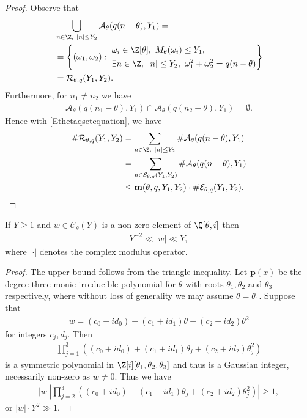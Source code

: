 \documentclass[12pt]{amsart}
\newcommand{\1}{\mathmybb{1}}
\begin{document}
\begin{proof}
Observe that
\begin{align*}
&\bigcup_{n\in\Z, \ |n| \leq Y_{2}}\mathcal{A}_{\theta}(q(n-\theta),Y_{1}) = \\
&= \left\{(\omega_{1},\omega_{2}): \  
\begin{aligned} 
&\omega_{i}\in \Z[\theta], \ M_{\theta}(\omega_{i}) \leq Y_{1}, \\ 
&\exists n \in \Z, \ |n| \leq Y_{2}, \ \omega_{1}^2+\omega_{2}^2 = q(n-\theta)
\end{aligned}\right\}\\
&= \mathcal{R}_{\theta,q}(Y_{1},Y_{2}).
\end{align*}
Furthermore, for $n_{1} \neq n_{2}$ we have
\begin{align*}
\mathcal{A}_{\theta}(q(n_{1}-\theta),Y_{1})\cap \mathcal{A}_{\theta}(q(n_{2}-\theta),Y_{1}) = \emptyset.
\end{align*}
Hence with \eqref{Ethetaqsetequation}, we have
\begin{align*}
\# \mathcal{R}_{\theta,q}(Y_{1},Y_{2}) &= \sum_{n \in \Z, \ |n| \leq Y_{2}}\#\mathcal{A}_{\theta}(q(n-\theta),Y_{1})\\
&= \sum_{n \in \mathcal{E}_{\theta,q}(Y_{1},Y_{2})}\#\mathcal{A}_{\theta}(q(n-\theta),Y_{1})\\
&\leq \mathbf{m}(\theta,q,Y_{1},Y_{2})\cdot\#\mathcal{E}_{\theta,q}(Y_{1},Y_{2}).
\end{align*}
\par \vspace{-\baselineskip} \qedhere
\end{proof}
\begin{lem}
\label{LowerUpperboundsCthetaY}
If $Y \geq 1$ and $w \in \mathcal{C}_{\theta}(Y)$ is a non-zero element of $\Q[\theta,i]$ then 
\begin{align*}
Y^{-2}\ll |w| \ll Y,
\end{align*}
where $|\cdot|$ denotes the complex modulus operator.
\end{lem}
\begin{proof}
The upper bound follows from the triangle inequality. Let $\mathbf{p}(x)$ be the degree-three monic irreducible polynomial for $\theta$ with roots $\theta_{1},\theta_{2}$ and $\theta_{3}$ respectively, where without loss of generality we may assume $\theta = \theta_{1}$. Suppose that 
\begin{align*}
w = (c_{0}+id_{0}) + (c_{1}+id_{1})\theta +(c_{2}+id_{2})\theta^2
\end{align*}
for integers $c_{j},d_{j}$. Then 
\begin{align*}
\prod_{j=1}^{3}\left((c_{0}+id_{0}) + (c_{1}+id_{1})\theta_{j} +(c_{2}+id_{2})\theta_{j}^2\right)
\end{align*}
is a symmetric polynomial in $\Z[i][\theta_{1},\theta_{2},\theta_{3}]$ and thus is a Gaussian integer, necessarily non-zero as $w \neq 0$. Thus we have
\begin{align*}
|w|\left|\prod_{j=2}^{3}\left((c_{0}+id_{0}) + (c_{1}+id_{1})\theta_{j} +(c_{2}+id_{2})\theta_{j}^2\right)\right| \geq 1,
\end{align*}
or $|w|\cdot Y^{2} \gg 1$.
\end{proof}
\end{document}
